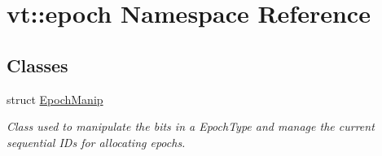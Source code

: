 \hypertarget{namespacevt_1_1epoch}{}\section{vt\+:\+:epoch Namespace Reference}
\label{namespacevt_1_1epoch}
\subsection*{Classes}
\begin{DoxyCompactItemize}
\item 
struct \hyperlink{structvt_1_1epoch_1_1_epoch_manip}{Epoch\+Manip}
\begin{DoxyCompactList}\small\item\em Class used to manipulate the bits in a {\ttfamily Epoch\+Type} and manage the current sequential I\+Ds for allocating epochs. \end{DoxyCompactList}\end{DoxyCompactItemize}
